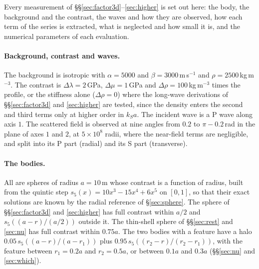\documentclass[11pt,a4paper]{article}
\begin{document}
Every measurement of \S\S\ref{sec:factor3d}--\ref{sec:higher} is set out here: the body, the background
and the contrast, the waves and how they are observed, how each term of the series is extracted, what
is neglected and how small it is, and the numerical parameters of each evaluation.

\paragraph{Background, contrast and waves.} The background is isotropic with $\alpha=5000$ and
$\beta=3000$\,m\,s$^{-1}$ and $\rho=2500$\,kg\,m$^{-3}$. The contrast is $\Delta\lambda=2$\,GPa,
$\Delta\mu=1$\,GPa and $\Delta\rho=100$\,kg\,m$^{-3}$ times the profile, or the stiffness alone
($\Delta\rho=0$) where the long-wave derivations of \S\S\ref{sec:factor3d} and \ref{sec:higher} are
tested, since the density enters the second and third terms only at higher order in $k_Sa$. The
incident wave is a P wave along axis $1$. The scattered field is observed at nine angles from $0.2$ to
$\pi-0.2$\,rad in the plane of axes $1$ and $2$, at $5\times10^8$ radii, where the near-field terms
are negligible, and split into its P part (radial) and its S part (transverse).

\paragraph{The bodies.} All are spheres of radius $a=10$\,m whose contrast is a function of radius,
built from the quintic step $s_5(x)=10x^3-15x^4+6x^5$ on $[0,1]$, so that their exact solutions are
known by the radial reference of \S\ref{sec:sphere}. The sphere of
\S\S\ref{sec:factor3d} and \ref{sec:higher} has full contrast within $a/2$ and $s_5((a-r)/(a/2))$
outside it. The thin-shell sphere of \S\S\ref{sec:rest} and \ref{sec:nu} has full contrast within
$0.75a$. The two bodies with a feature have a halo
$0.05\,s_5((a-r)/(a-r_1))$ plus $0.95\,s_5((r_2-r)/(r_2-r_1))$, with the feature between $r_1=0.2a$ and
$r_2=0.5a$, or between $0.1a$ and $0.3a$ (\S\S\ref{sec:nu} and \ref{sec:which}).
\end{document}
